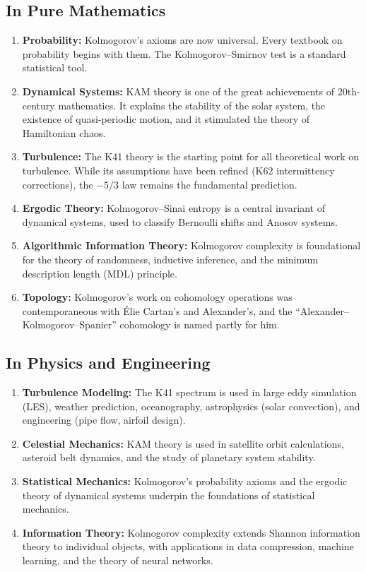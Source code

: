 \subsection{In Pure Mathematics}

\begin{enumerate}
    \item \textbf{Probability:} Kolmogorov's axioms are now universal. Every textbook on probability begins with them. The Kolmogorov--Smirnov test is a standard statistical tool.
    \item \textbf{Dynamical Systems:} KAM theory is one of the great achievements of 20th-century mathematics. It explains the stability of the solar system, the existence of quasi-periodic motion, and it stimulated the theory of Hamiltonian chaos.
    \item \textbf{Turbulence:} The K41 theory is the starting point for all theoretical work on turbulence. While its assumptions have been refined (K62 intermittency corrections), the $-5/3$ law remains the fundamental prediction.
    \item \textbf{Ergodic Theory:} Kolmogorov--Sinai entropy is a central invariant of dynamical systems, used to classify Bernoulli shifts and Anosov systems.
    \item \textbf{Algorithmic Information Theory:} Kolmogorov complexity is foundational for the theory of randomness, inductive inference, and the minimum description length (MDL) principle.
    \item \textbf{Topology:} Kolmogorov's work on cohomology operations was contemporaneous with {\'E}lie Cartan's and Alexander's, and the ``Alexander--Kolmogorov--Spanier'' cohomology is named partly for him.
\end{enumerate}

\subsection{In Physics and Engineering}

\begin{enumerate}
    \item \textbf{Turbulence Modeling:} The K41 spectrum is used in large eddy simulation (LES), weather prediction, oceanography, astrophysics (solar convection), and engineering (pipe flow, airfoil design).
    \item \textbf{Celestial Mechanics:} KAM theory is used in satellite orbit calculations, asteroid belt dynamics, and the study of planetary system stability.
    \item \textbf{Statistical Mechanics:} Kolmogorov's probability axioms and the ergodic theory of dynamical systems underpin the foundations of statistical mechanics.
    \item \textbf{Information Theory:} Kolmogorov complexity extends Shannon information theory to individual objects, with applications in data compression, machine learning, and the theory of neural networks.
\end{enumerate}

